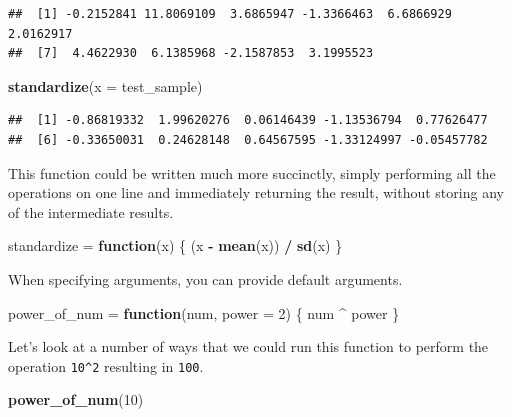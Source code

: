 \documentclass[]{book}
\newenvironment{Shaded}{\begin{snugshade}}{\end{snugshade}}
\newcommand{\KeywordTok}[1]{\textcolor[rgb]{0.13,0.29,0.53}{\textbf{#1}}}
\newcommand{\DataTypeTok}[1]{\textcolor[rgb]{0.13,0.29,0.53}{#1}}
\newcommand{\DecValTok}[1]{\textcolor[rgb]{0.00,0.00,0.81}{#1}}
\newcommand{\StringTok}[1]{\textcolor[rgb]{0.31,0.60,0.02}{#1}}
\newcommand{\ControlFlowTok}[1]{\textcolor[rgb]{0.13,0.29,0.53}{\textbf{#1}}}
\newcommand{\OperatorTok}[1]{\textcolor[rgb]{0.81,0.36,0.00}{\textbf{#1}}}
\newcommand{\NormalTok}[1]{#1}
\theoremstyle{definition}
\theoremstyle{definition}
\theoremstyle{definition}
\theoremstyle{remark}
\begin{document}
\begin{verbatim}
##  [1] -0.2152841 11.8069109  3.6865947 -1.3366463  6.6866929  2.0162917
##  [7]  4.4622930  6.1385968 -2.1587853  3.1995523
\end{verbatim}

\begin{Shaded}
\begin{Highlighting}[]
\KeywordTok{standardize}\NormalTok{(}\DataTypeTok{x =}\NormalTok{ test_sample)}
\end{Highlighting}
\end{Shaded}

\begin{verbatim}
##  [1] -0.86819332  1.99620276  0.06146439 -1.13536794  0.77626477
##  [6] -0.33650031  0.24628148  0.64567595 -1.33124997 -0.05457782
\end{verbatim}

This function could be written much more succinctly, simply performing
all the operations on one line and immediately returning the result,
without storing any of the intermediate results.

\begin{Shaded}
\begin{Highlighting}[]
\NormalTok{standardize =}\StringTok{ }\ControlFlowTok{function}\NormalTok{(x) \{}
\NormalTok{  (x }\OperatorTok{-}\StringTok{ }\KeywordTok{mean}\NormalTok{(x)) }\OperatorTok{/}\StringTok{ }\KeywordTok{sd}\NormalTok{(x)}
\NormalTok{\}}
\end{Highlighting}
\end{Shaded}

When specifying arguments, you can provide default arguments.

\begin{Shaded}
\begin{Highlighting}[]
\NormalTok{power_of_num =}\StringTok{ }\ControlFlowTok{function}\NormalTok{(num, }\DataTypeTok{power =} \DecValTok{2}\NormalTok{) \{}
\NormalTok{  num }\OperatorTok{^}\StringTok{ }\NormalTok{power}
\NormalTok{\}}
\end{Highlighting}
\end{Shaded}

Let's look at a number of ways that we could run this function to
perform the operation \texttt{10\^{}2} resulting in \texttt{100}.

\begin{Shaded}
\begin{Highlighting}[]
\KeywordTok{power_of_num}\NormalTok{(}\DecValTok{10}\NormalTok{)}
\end{Highlighting}
\end{Shaded}
\end{document}
